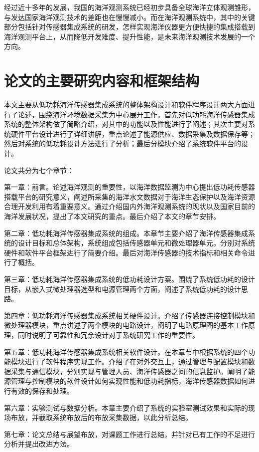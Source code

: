 经过近十多年的发展，我国的海洋观测系统已经初步具备全球海洋立体观测雏形，与发达国家海洋观测技术的差距也在慢慢减小。而在海洋观测系统中，其中的关键部分包括针对传感器集成系统的研发，怎样实现海洋仪器更方便快捷的集成搭载到海洋观测平台上，从而降低开发难度、提升性能，是未来海洋观测技术发展的一个方向。

\section{论文的主要研究内容和框架结构}
本文主要从低功耗海洋传感器集成系统的整体架构设计和软件程序设计两大方面进行了论述，围绕海洋环境数据采集为中心展开工作。首先对低功耗海洋传感器集成系统的整体架构做了简略介绍，对其中的功能以及性能进行了阐述；其次主要对系统硬件平台设计进行了详细讲解，重点论述了能源供应、数据采集及数据保存等；然后对系统的低功耗设计方法进行了分析；最后分模块介绍了系统软件平台的设计。

论文共分为七个章节：

第一章：前言。论述海洋观测的重要性，以海洋数据监测为中心提出低功耗传感器搭载平台的研究意义，阐述所采集的海洋水文数据对于海洋生态保护以及海洋资源合理开发利用有着重要意义。通过介绍国内外海洋观测系统的现状以及国家目前的海洋发展状况，提出了本文研究的重点。最后介绍了本文的章节安排。

第二章：低功耗海洋传感器集成系统的组成。本章节主要介绍了海洋传感器集成系统的设计目标和总体架构，系统组成包括传感器单元和微处理器单元。分别对系统硬件和软件平台框架进行了简要介绍。最后对海洋传感器的技术指标和相关命令进行了概括。

第三章：低功耗海洋传感器集成系统的低功耗设计方案。围绕了系统低功耗的设计目标，从嵌入式微处理器选型和电源管理两个方面，阐述了系统低功耗的设计思路。

第四章：低功耗海洋传感器集成系统相关硬件设计。介绍了传感器连接控制模块和微处理器模块，重点讲述了两个模块的电路设计，阐明了电路原理图的基本工作原理，同时说明了可靠性和冗余设计对于系统研究工作的重要性。

第五章：低功耗海洋传感器集成系统相关软件设计。在本章节中根据系统的四个功能模块进行了软件程序实现工作。介绍了在对外交互上，通过管理与配置模块和数据采集与通信模块，分别实现与管理人员、海洋传感器之间的信息监护。阐明了能源管理与控制模块的软件设计如何实现性能和低功耗指标，海洋传感器数据如何进行有效的保存和处理。

第六章：实验测试与数据分析。本章主要介绍了系统的实验室测试效果和实际的现场布放，并截取系统布放后的布放采集数据，以此分析总结。

第七章：论文总结与展望布放，对课题工作进行总结，并针对已有工作的不足进行分析并提出改进方法。
